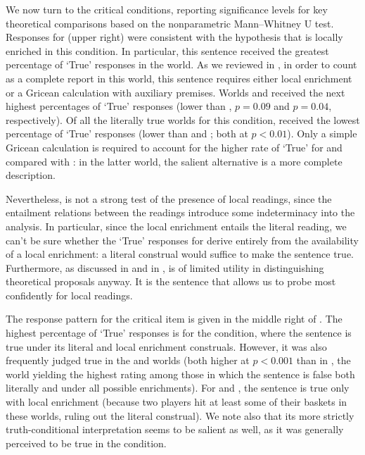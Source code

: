 \documentclass[leqno,12pt]{article}
\begin{document}

We now turn to the critical conditions, reporting significance levels
for key theoretical comparisons based on the nonparametric
Mann--Whitney U test. Responses for  (upper right)
were consistent with the hypothesis that  is locally
enriched in this condition. In particular, this sentence received the
greatest percentage of `True' responses in the  world. As
we reviewed in , in order to count as a
complete report in this world, this sentence requires either local
enrichment or a Gricean calculation with auxiliary premises. Worlds
 and  received the next highest percentages of
`True' responses (lower than , $p = 0.09$ and $p = 0.04$,
respectively). Of all the literally true worlds for this condition,
 received the lowest percentage of `True' responses (lower
than  and ; both at $p < 0.01$).  Only a simple
Gricean calculation is required to account for the higher rate of
`True' for  and  compared with : in
the latter world, the salient alternative  is a more complete description.

Nevertheless,  is not a strong test of the
presence of local readings, since the entailment relations between the
readings introduce some indeterminacy into the analysis. In
particular, since the local enrichment entails the literal reading, we
can't be sure whether the `True' responses for  derive
entirely from the availability of a local enrichment: a literal
construal would suffice to make the sentence true. Furthermore, as
discussed in  and in
\citeauthor{Chemla:Spector:2011},  is of limited
utility in distinguishing theoretical proposals anyway. It is the
 sentence that allows us to probe most
confidently for local readings.

The response pattern for the critical item 
is given in the middle right of . The
highest percentage of `True' responses is for the 
condition, where the sentence is true under its literal and local
enrichment construals. However, it was also frequently judged true in
the  and  worlds (both higher at $p < 0.001$
than in , the world yielding the highest rating among those
in which the sentence is false both literally and under all possible
enrichments). For  and , the sentence is true
only with local enrichment (because two players hit at least some of
their baskets in these worlds, ruling out the literal construal).  We
note also that its more strictly truth-conditional interpretation
seems to be salient as well, as it was generally perceived to be true
in the  condition.
\end{document}
